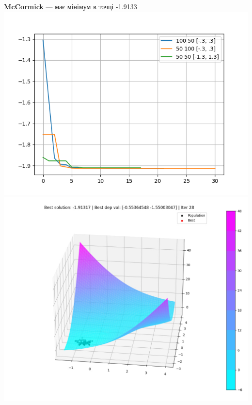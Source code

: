 \documentclass{article}
\begin{document}
        \newpage
        \textbf{McCormick} --- має мінімум в точці -1.9133
            \newline
            \includegraphics[scale=0.7]{McCormick_dif.png}
            \newline
            \includegraphics[scale=0.7]{McCormick.jpg}
            \newline
\end{document}
